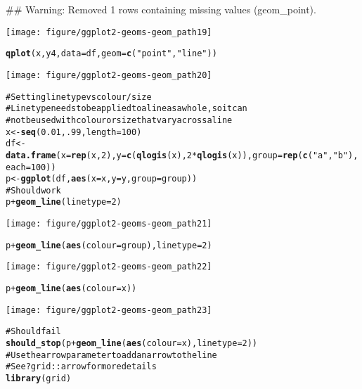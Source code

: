 \documentclass[a4paper,titlepage]{tufte-handout}\usepackage{graphicx, color}
\makeatletter
\def\maxwidth{ %
  \ifdim\Gin@nat@width>\linewidth
    \linewidth
  \else
    \Gin@nat@width
  \fi
}
\newcommand{\hlfunctioncall}[1]{\textcolor[rgb]{0.501960784313725,0,0.329411764705882}{\textbf{#1}}}%
\newcommand{\hlstring}[1]{\textcolor[rgb]{0.6,0.6,1}{#1}}%
\newcommand{\hlcomment}[1]{\textcolor[rgb]{0.180392156862745,0.6,0.341176470588235}{#1}}%
\newenvironment{kframe}{%
 \def\at@end@of@kframe{}%
 \ifinner\ifhmode%
  \def\at@end@of@kframe{\end{minipage}}%
  \begin{minipage}{\columnwidth}%
 \fi\fi%
 \def\FrameCommand##1{\hskip\@totalleftmargin \hskip-\fboxsep
 \colorbox{shadecolor}{##1}\hskip-\fboxsep
     \hskip-\linewidth \hskip-\@totalleftmargin \hskip\columnwidth}%
 \MakeFramed {\advance\hsize-\width
   \@totalleftmargin\z@ \linewidth\hsize
   \@setminipage}}%
 {\par\unskip\endMakeFramed%
 \at@end@of@kframe}
\newenvironment{knitrout}{}{} %
\makeatother
\begin{document}
\begin{knitrout}
\begin{kframe}
{\ttfamily\noindent\textcolor{warningcolor}{\#\# Warning: Removed 1 rows containing missing values (geom\_point).}}\end{kframe}\texttt{[image: figure/ggplot2-geoms-geom\_path19]} \begin{kframe}\begin{alltt}
\hlfunctioncall{qplot}(x, y4, data = df, geom = \hlfunctioncall{c}(\hlstring{"point"},\hlstring{"line"}))
\end{alltt}
\end{kframe}\texttt{[image: figure/ggplot2-geoms-geom\_path20]} \begin{kframe}\begin{alltt}
\hlcomment{# Setting line type vs colour/size}
\hlcomment{# Line type needs to be applied to a line as a whole, so it can}
\hlcomment{# not be used with colour or size that vary across a line}
x <- \hlfunctioncall{seq}(0.01, .99, length=100)
df <- \hlfunctioncall{data.frame}(x = \hlfunctioncall{rep}(x, 2), y = \hlfunctioncall{c}(\hlfunctioncall{qlogis}(x), 2 * \hlfunctioncall{qlogis}(x)), group = \hlfunctioncall{rep}(\hlfunctioncall{c}(\hlstring{"a"},\hlstring{"b"}), each=100))
p <- \hlfunctioncall{ggplot}(df, \hlfunctioncall{aes}(x=x, y=y, group=group))
\hlcomment{# Should work}
p + \hlfunctioncall{geom_line}(linetype = 2)
\end{alltt}
\end{kframe}\texttt{[image: figure/ggplot2-geoms-geom\_path21]} \begin{kframe}\begin{alltt}
p + \hlfunctioncall{geom_line}(\hlfunctioncall{aes}(colour = group), linetype = 2)
\end{alltt}
\end{kframe}\texttt{[image: figure/ggplot2-geoms-geom\_path22]} \begin{kframe}\begin{alltt}
p + \hlfunctioncall{geom_line}(\hlfunctioncall{aes}(colour = x))
\end{alltt}
\end{kframe}\texttt{[image: figure/ggplot2-geoms-geom\_path23]} \begin{kframe}\begin{alltt}
\hlcomment{# Should fail}
\hlfunctioncall{should_stop}(p + \hlfunctioncall{geom_line}(\hlfunctioncall{aes}(colour = x), linetype=2))
\hlcomment{# Use the arrow parameter to add an arrow to the line}
\hlcomment{# See ?grid::arrow for more details}
\hlfunctioncall{library}(grid)

\end{alltt}
\end{kframe}
\end{knitrout}
\end{document}
